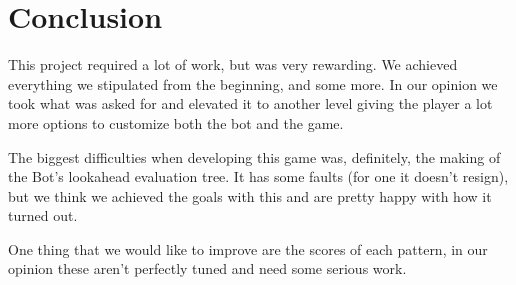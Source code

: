 \documentclass[12pt,a4paper,notitlepage]{article}
\begin{document}
\section{Conclusion}
\label{sec:conc}

This project required a lot of work, but was very rewarding.
We achieved everything we stipulated from the beginning, and some more. In our opinion we took what was asked for and elevated it to another level giving the player a lot more options to customize both the bot and the game.

The biggest difficulties when developing this game was, definitely, the making of the Bot's lookahead evaluation tree. It has some faults (for one it doesn't resign), but we think we achieved the goals with this and are pretty happy with how it turned out.

One thing that we would like to improve are the scores of each pattern, in our opinion these aren't perfectly tuned and need some serious work.

\printbibliography
\end{document}
